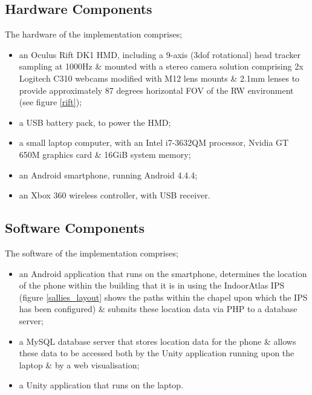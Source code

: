 \subsection{Hardware Components}
The hardware of the implementation comprises;

\begin{itemize}
	\item an Oculus Rift DK1 HMD, including a 9-axis (3dof rotational) head tracker sampling at 1000Hz \& mounted with a stereo camera solution comprising 2x Logitech C310 webcams modified with M12 lens mounts \& 2.1mm lenses to provide approximately 87 degrees horizontal FOV of the RW environment (see figure \ref{rift});
	\item a USB battery pack, to power the HMD;
	\item a small laptop computer, with an Intel i7-3632QM processor, Nvidia GT 650M graphics card \& 16GiB system memory;
	\item an Android smartphone, running Android 4.4.4;
	\item an Xbox 360 wireless controller, with USB receiver.
\end{itemize}



\subsection{Software Components}
The software of the implementation comprises;

\begin{itemize}
	\item an Android application that runs on the smartphone, determines the location of the phone within the building that it is in using the IndoorAtlas IPS~\cite{IndoorAtlasLtd.2012} (figure \ref{sallies_layout} shows the paths within the chapel upon which the IPS has been configured) \& submits these location data via PHP to a database server;
	\item a MySQL database server that stores location data for the phone \& allows these data to be accessed both by the Unity application running upon the laptop \& by a web visualisation;
	\item a Unity application that runs on the laptop.
\end{itemize}

